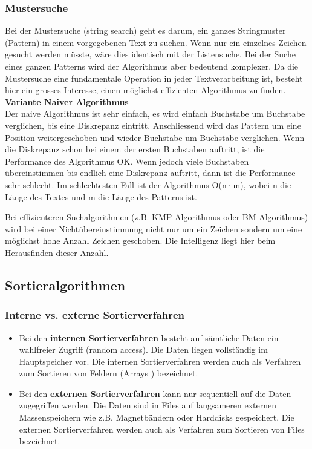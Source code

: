 \subsubsection{Mustersuche}
Bei der Mustersuche (string search) geht es darum, ein ganzes Stringmuster (Pattern) in einem vorgegebenen Text zu suchen. Wenn nur ein einzelnes Zeichen gesucht werden müsste, wäre dies identisch mit der Listensuche. Bei der Suche eines ganzen Patterns wird der Algorithmus aber bedeutend komplexer. Da die Mustersuche eine fundamentale Operation in jeder Textverarbeitung ist, besteht hier ein grosses Interesse, einen möglichst effizienten Algorithmus zu finden.\\

\textbf{Variante Naiver Algorithmus}\\
Der naive Algorithmus ist sehr einfach, es wird einfach Buchstabe um Buchstabe verglichen, bis eine Diskrepanz eintritt. Anschliessend wird das Pattern um eine Position weitergeschoben und wieder
Buchstabe um Buchstabe verglichen. Wenn die Diskrepanz schon bei einem der ersten Buchstaben auftritt, ist die Performance des Algorithmus OK. Wenn jedoch viele Buchstaben übereinstimmen bis endlich eine Diskrepanz auftritt, dann ist die Performance sehr schlecht. Im schlechtesten Fall ist der Algorithmus O(n·m), wobei n die Länge des Textes und m die Länge des Patterns ist.

Bei effizienteren Suchalgorithmen (z.B. KMP-Algorithmus oder BM-Algorithmus) wird bei einer Nichtübereinstimmung nicht nur um ein Zeichen sondern um eine möglichst hohe Anzahl Zeichen geschoben. Die Intelligenz liegt hier beim Herausfinden dieser Anzahl.


\subsection{Sortieralgorithmen}

\subsubsection{Interne vs. externe Sortierverfahren}
\begin{itemize}
    \item Bei den \textbf{internen Sortierverfahren} besteht auf sämtliche Daten ein wahlfreier Zugriff (random access). Die Daten liegen vollständig im Hauptspeicher vor. Die internen Sortierverfahren werden auch als Verfahren zum Sortieren von Feldern (Arrays ) bezeichnet.
    \item Bei den \textbf{externen Sortierverfahren} kann nur sequentiell auf die Daten zugegriffen werden. Die Daten sind in Files auf langsameren externen Massenspeichern wie z.B. Magnetbändern oder Harddisks gespeichert. Die externen Sortierverfahren werden auch als Verfahren zum Sortieren von Files bezeichnet.
\end{itemize}


